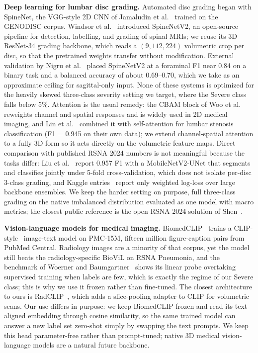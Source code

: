 \documentclass[runningheads]{llncs}
\begin{document}
\textbf{Deep learning for lumbar disc grading.}
Automated disc grading began with SpineNet, the VGG-style 2D CNN of Jamaludin et al.~\cite{jamaludin2017} trained on the GENODISC corpus. Windsor et al.~\cite{windsor2022} introduced SpineNetV2, an open-source pipeline for detection, labelling, and grading of spinal MRIs; we reuse its 3D ResNet-34 grading backbone, which reads a $(9, 112, 224)$ volumetric crop per disc, so that the pretrained weights transfer without modification. External validation by Nigru et al.~\cite{nigru2024} placed SpineNetV2 at a foraminal F1 near 0.84 on a binary task and a balanced accuracy of about 0.69--0.70, which we take as an approximate ceiling for sagittal-only input. None of these systems is optimized for the heavily skewed three-class severity setting we target, where the Severe class falls below 5\%. Attention is the usual remedy: the CBAM block of Woo et al.~\cite{woo2018cbam} reweights channel and spatial responses and is widely used in 2D medical imaging, and Lin et al.~\cite{lin2024cbam} combined it with self-attention for lumbar stenosis classification (F1 = 0.945 on their own data); we extend channel-spatial attention to a fully 3D form so it acts directly on the volumetric feature maps. Direct comparison with published RSNA 2024 numbers is not meaningful because the tasks differ: Liu et al.~\cite{aktan2025} report 0.957 F1 with a MobileNetV2-UNet that segments and classifies jointly under 5-fold cross-validation, which does not isolate per-disc 3-class grading, and Kaggle entries~\cite{kaggle2024} report only weighted log-loss over large backbone ensembles. We keep the harder setting on purpose, full three-class grading on the native imbalanced distribution evaluated as one model with macro metrics; the closest public reference is the open RSNA 2024 solution of Shen~\cite{nshen2024}.

\textbf{Vision-language models for medical imaging.}
BiomedCLIP~\cite{zhang2023biomedclip} trains a CLIP-style~\cite{radford2021clip} image-text model on PMC-15M, fifteen million figure-caption pairs from PubMed Central. Radiology images are a minority of that corpus, yet the model still beats the radiology-specific BioViL on RSNA Pneumonia, and the benchmark of Woerner and Baumgartner~\cite{datascarcity2024} shows its linear probe overtaking supervised training when labels are few, which is exactly the regime of our Severe class; this is why we use it frozen rather than fine-tuned. The closest architecture to ours is RadCLIP~\cite{lu2024radclip}, which adds a slice-pooling adapter to CLIP for volumetric scans. Our use differs in purpose: we keep BiomedCLIP frozen and read its text-aligned embedding through cosine similarity, so the same trained model can answer a new label set zero-shot simply by swapping the text prompts. We keep this head parameter-free rather than prompt-tuned; native 3D medical vision-language models are a natural future backbone.
\end{document}
